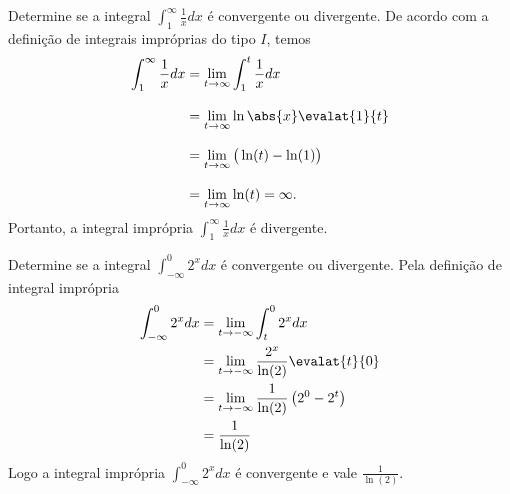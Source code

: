 \begin{example}
  Determine se a integral \(\int_1^{\infty} \frac{1}{x} dx\)
  é convergente ou divergente.
  \solution
  De acordo com a definição de integrais impróprias do tipo $I$, temos
  \begin{align*}
   \int_1^{\infty}  \frac{1}{x} dx
    & = \lim_{t \to \infty} \int_1^{t} \frac{1}{x} dx   \\[3mm]
    & = \lim_{t \to \infty} \ln\abs{x} \evalat{1}{t}    \\[3mm]
    & = \lim_{t \to \infty} \big(\ln(t)- \ln(1)\big)    \\[3mm]
    & = \lim_{t \to \infty} \ln(t)= \infty.
  \end{align*}
  Portanto, a integral imprópria \(\int_1^{\infty} \frac{1}{x}dx\)
  é divergente.
\end{example}

\begin{example}
  Determine se a integral \(\int_{-\infty}^0 2^x dx\)
  é convergente ou divergente.
  \solution
  Pela definição de integral imprópria
  \begin{align*}
    \int_{-\infty}^0 2^x dx
    & = \lim_{t \to - \infty} \int_t^{0} 2^x dx \\
    & = \lim_{t \to - \infty} \frac{2^x}{\ln(2)} \evalat{t}{0}  \\
    & = \lim_{t \to - \infty} \frac{1}{\ln(2)} \left( 2^0 - 2^t \right) \\
    & = \frac{1}{\ln(2)}
  \end{align*}
  Logo a integral imprópria \(\int_{-\infty}^0 2^x dx\) é convergente e vale
  \(\frac{1}{\ln(2)}\).
\end{example}

